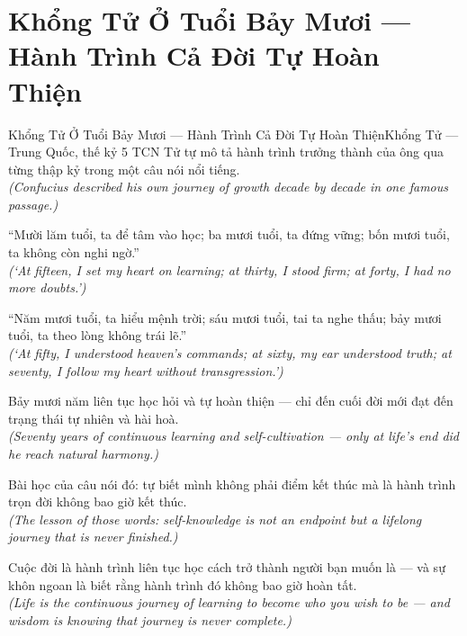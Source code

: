 \section{Khổng Tử Ở Tuổi Bảy Mươi --- Hành Trình Cả Đời Tự Hoàn Thiện}
\begin{truyen}{Khổng Tử Ở Tuổi Bảy Mươi --- Hành Trình Cả Đời Tự Hoàn Thiện}{Khổng Tử --- Trung Quốc, thế kỷ 5 TCN}
 Tử tự mô tả hành trình trưởng thành của ông qua từng thập kỷ trong một câu nói nổi tiếng.\\[4pt]
\textit{(Confucius described his own journey of growth decade by decade in one famous passage.)}

``Mười lăm tuổi, ta để tâm vào học; ba mươi tuổi, ta đứng vững; bốn mươi tuổi, ta không còn nghi ngờ.''\\[4pt]
\textit{(`At fifteen, I set my heart on learning; at thirty, I stood firm; at forty, I had no more doubts.')}

``Năm mươi tuổi, ta hiểu mệnh trời; sáu mươi tuổi, tai ta nghe thấu; bảy mươi tuổi, ta theo lòng không trái lẽ.''\\[4pt]
\textit{(`At fifty, I understood heaven's commands; at sixty, my ear understood truth; at seventy, I follow my heart without transgression.')}

Bảy mươi năm liên tục học hỏi và tự hoàn thiện --- chỉ đến cuối đời mới đạt đến trạng thái tự nhiên và hài hoà.\\[4pt]
\textit{(Seventy years of continuous learning and self-cultivation --- only at life's end did he reach natural harmony.)}

Bài học của câu nói đó: tự biết mình không phải điểm kết thúc mà là hành trình trọn đời không bao giờ kết thúc.\\[4pt]
\textit{(The lesson of those words: self-knowledge is not an endpoint but a lifelong journey that is never finished.)}

\end{truyen}
\begin{baihoc}
  Cuộc đời là hành trình liên tục học cách trở thành người bạn muốn là --- và sự khôn ngoan là biết rằng hành trình đó không bao giờ hoàn tất.\\[4pt]
  \textit{(Life is the continuous journey of learning to become who you wish to be --- and wisdom is knowing that journey is never complete.)}
\end{baihoc}
